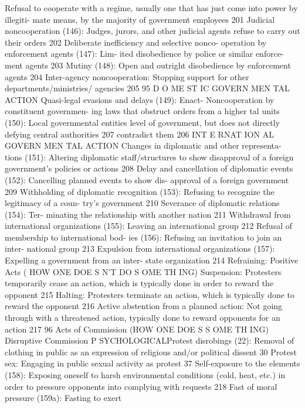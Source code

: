 \documentclass[twoside,a4paper,12pt,fleqn,openany]{extbook}
\begin{document}
Refusal to cooperate with a regime, usually
one that has just come into power by illegiti-
mate means, by the majority of government
employees
 201
Judicial noncooperation (146): Judges, jurors,
and other judicial agents refuse to carry out
their orders
 202
Deliberate inefficiency and selective nonco-
operation by enforcement agents (147): Lim-
ited disobedience by police or similar enforce-
ment agents
 203
Mutiny (148): Open and outright disobedience
by enforcement agents
 204
Inter-agency noncooperation: Stopping
support for other departments/ministries/
agencies
 205
95
D O ME ST IC GOVERN MEN TAL ACTION
Quasi-legal evasions and delays (149): Enact-
 Noncooperation by constituent governmen-
ing laws that obstruct orders from a higher
 tal units (150): Local governmental entities
level of government, but does not directly
 defying central authorities
 207
contradict them
 206
INT E RNAT ION AL GOVERN MEN TAL ACTION
Changes in diplomatic and other representa-
tions (151): Altering diplomatic staff/structures
to show disapproval of a foreign government’s
policies or actions
 208
Delay and cancellation of diplomatic events
(152): Cancelling planned events to show dis-
approval of a foreign government
 209
Withholding of diplomatic recognition (153):
Refusing to recognize the legitimacy of a coun-
try’s government
 210
Severance of diplomatic relations (154): Ter-
minating the relationship with another nation		
211
Withdrawal from international organizations
(155): Leaving an international group
 212
Refusal of membership to international bod-
ies (156): Refusing an invitation to join an inter-
national group
 213
Expulsion from international organizations
(157): Expelling a government from an inter-
state organization
 214
Refraining: Positive Acts
( HOW ONE DOE S N’T DO S OME TH ING)
Suspension: Protesters temporarily cease an
action, which is typically done in order to
reward the opponent
 215
Halting: Protesters terminate an action, which
is typically done to reward the opponent 216
Active abstention from a planned action:
Not going through with a threatened action,
typically done to reward opponents for an
action
 217
96
Acts of Commission
(HOW ONE DOE S S OME TH ING)
Disruptive Commission
P SYCHOLOGICALProtest disrobings (22): Removal of clothing
in public as an expression of religious and/or
political dissent
 30
Protest sex: Engaging in public sexual activity
as protest
 37
Self-exposure to the elements (158): Exposing
oneself to harsh environmental conditions
(cold, heat, etc.) in order to pressure opponents
into complying with requests
 218
Fast of moral pressure (159a): Fasting to exert
\end{document}
